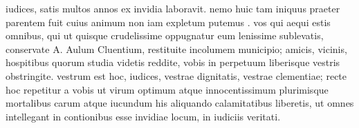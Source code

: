  iudices, satis multos annos ex invidia laboravit. nemo huic tam iniquus praeter parentem fuit cuius animum non iam expletum putemus . vos qui aequi estis omnibus, qui ut quisque crudelissime oppugnatur eum lenissime sublevatis, conservate A. Aulum Cluentium, restituite incolumem municipio; amicis, vicinis, hospitibus quorum studia videtis reddite, vobis in perpetuum liberisque vestris obstringite. vestrum est hoc, iudices, vestrae dignitatis, vestrae clementiae; recte hoc repetitur a vobis ut virum optimum atque innocentissimum plurimisque mortalibus carum atque iucundum his aliquando calamitatibus liberetis, ut omnes intellegant in contionibus esse invidiae locum, in iudiciis veritati.
